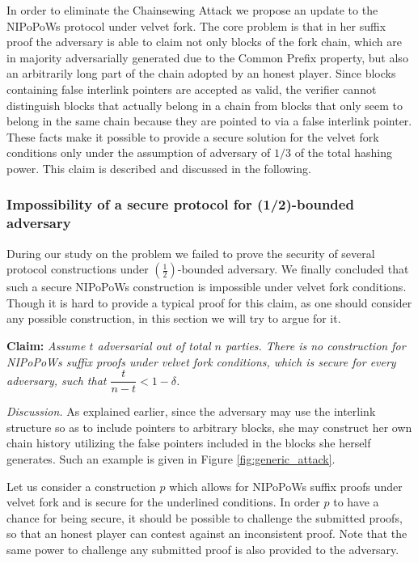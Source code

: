 In order to eliminate the Chainsewing Attack we propose an update to the NIPoPoWs
protocol under velvet fork. The core problem is that in her suffix proof the adversary
is able to claim not only blocks of the fork chain,  which are in majority adversarially
generated due to the Common Prefix property, but also an arbitrarily long part of the
chain adopted by an honest player. Since blocks containing false interlink pointers
are accepted as valid, the verifier cannot distinguish blocks that actually belong
in a chain from blocks that only seem to belong in the same chain because they are
pointed to via a false interlink pointer. \\

These facts make it possible to provide a secure solution for the velvet fork
conditions only under the assumption of adversary of $1/3$ of the total hashing
power. This claim is described and discussed in the following.

\subsubsection*{Impossibility of a secure protocol for (1/2)-bounded adversary}
During our study on the problem we failed to prove the security of several protocol
constructions under $(\frac{1}{2})$-bounded adversary. We finally concluded that
such a secure NIPoPoWs construction is impossible under velvet fork conditions.
Though it is hard to provide a typical proof for this claim, as one should consider
any possible construction, in this section we will try to argue for it.

\textbf{Claim:} \textit{Assume $t$ adversarial out of total $n$ parties. There is
no construction for NIPoPoWs suffix proofs under velvet fork conditions, which is
secure for every adversary, such that $\dfrac{t}{n-t} < 1 - \delta$.}

\textit{Discussion.} As explained earlier, since the adversary may use the interlink
structure so as to include pointers to arbitrary blocks,  she may construct her own
chain history utilizing the false pointers included in the blocks she herself generates.
Such an example is given in Figure \ref{fig:generic_attack}.

Let us consider a construction $p$ which allows for NIPoPoWs suffix proofs under velvet
fork and is secure for the underlined conditions. In order $p$ to have a chance for
being secure, it should be possible to challenge the submitted proofs, so that an
honest player can contest against an inconsistent proof. Note that the same power
to challenge any submitted proof is also provided to the adversary.

